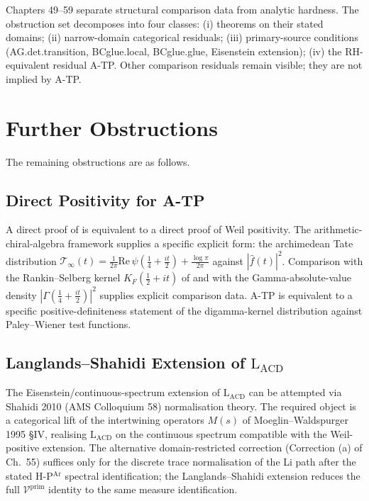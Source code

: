 \begin{remark}
\label{v4-arith:w5-synth:rem:irreducible}
Chapters 49--59 separate structural comparison data from analytic hardness.
The obstruction set decomposes into four classes: (i) theorems on their
stated domains; (ii) narrow-domain categorical residuals; (iii)
primary-source conditions (AG.det.transition, BCglue.local,
BCglue.glue, Eisenstein extension); (iv) the RH-equivalent residual
A-TP. Other comparison residuals remain visible; they are not implied
by A-TP.
\end{remark}

\section{Further Obstructions}
\label{v4-arith:w5-synth:path-forward}

The remaining obstructions are as follows.

\subsection{Direct Positivity for A-TP}
\label{v4-arith:w5-synth:direct-ATP}

A direct proof of 
is equivalent to a direct proof of Weil positivity. The
arithmetic-chiral-algebra framework supplies a specific explicit
form: the archimedean Tate distribution
\(\mathcal{T}_{\infty}(t)=\frac{1}{2\pi}\mathrm{Re}\,\psi(\frac{1}{4}+\frac{it}{2})+\frac{\log\pi}{2\pi}\)
against \(|\widehat{f}(t)|^{2}\). Comparison with the
Rankin--Selberg kernel
\(K_{F}(\frac{1}{2}+it)\) of 
and with the Gamma-absolute-value density
\(|\Gamma(\frac{1}{4}+\frac{it}{2})|^{2}\) supplies explicit
comparison data. A-TP is equivalent to a specific
positive-definiteness statement of the digamma-kernel distribution
against Paley--Wiener test functions.

\subsection{Langlands--Shahidi Extension of \(\mathrm{L}_{\mathrm{ACD}}\)}
\label{v4-arith:w5-synth:LS-extension}

The Eisenstein/continuous-spectrum extension of
\(\mathrm{L}_{\mathrm{ACD}}\) can be attempted via
Shahidi 2010 (AMS Colloquium 58) normalisation theory. The
required object is a categorical lift of the intertwining operators
\(M(s)\) of Moeglin--Waldspurger 1995 \S IV, realising
\(\mathrm{L}_{\mathrm{ACD}}\) on the continuous spectrum compatible
with the Weil-positive extension. The alternative domain-restricted
correction (Correction (a) of Ch.~55) suffices only for the discrete trace
normalisation of the Li path after the stated H-P\(^{\mathrm{Ar}}\)
spectral identification; the Langlands--Shahidi extension reduces the full
\(\mathcal{V}^{\mathrm{prim}}\) identity to the same measure
identification.


